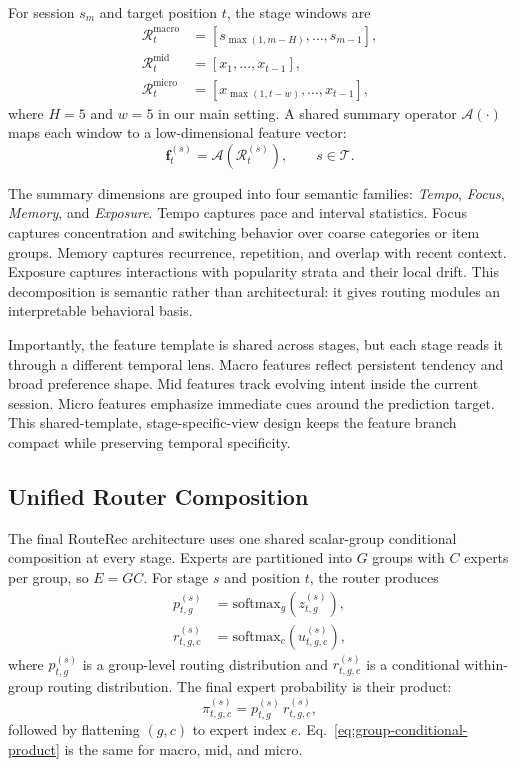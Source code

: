 \documentclass[sigconf,review,anonymous]{acmart}
\begin{document}
For session $s_m$ and target position $t$, the stage windows are
\begin{align}
\mathcal{R}^{\mathrm{macro}}_t &= [s_{\max(1,m-H)},\dots,s_{m-1}], \\
\mathcal{R}^{\mathrm{mid}}_t &= [x_1,\dots,x_{t-1}], \\
\mathcal{R}^{\mathrm{micro}}_t &= [x_{\max(1,t-w)},\dots,x_{t-1}],
\end{align}
where $H=5$ and $w=5$ in our main setting. A shared summary operator $\mathcal{A}(\cdot)$ maps each window to a low-dimensional feature vector:
\[
\mathbf{f}^{(s)}_t=\mathcal{A}(\mathcal{R}^{(s)}_t),\qquad s\in\mathcal{T}.
\]

The summary dimensions are grouped into four semantic families: \textit{Tempo}, \textit{Focus}, \textit{Memory}, and \textit{Exposure}. Tempo captures pace and interval statistics. Focus captures concentration and switching behavior over coarse categories or item groups. Memory captures recurrence, repetition, and overlap with recent context. Exposure captures interactions with popularity strata and their local drift. This decomposition is semantic rather than architectural: it gives routing modules an interpretable behavioral basis.

Importantly, the feature template is shared across stages, but each stage reads it through a different temporal lens. Macro features reflect persistent tendency and broad preference shape. Mid features track evolving intent inside the current session. Micro features emphasize immediate cues around the prediction target. This shared-template, stage-specific-view design keeps the feature branch compact while preserving temporal specificity.

\subsection{Unified Router Composition}

The final RouteRec architecture uses one shared scalar-group conditional composition at every stage. Experts are partitioned into $G$ groups with $C$ experts per group, so $E=GC$. For stage $s$ and position $t$, the router produces
\begin{align}
p^{(s)}_{t,g} &= \mathrm{softmax}_g\!\left(z^{(s)}_{t,g}\right), \\
r^{(s)}_{t,g,c} &= \mathrm{softmax}_c\!\left(u^{(s)}_{t,g,c}\right),
\end{align}
where $p^{(s)}_{t,g}$ is a group-level routing distribution and $r^{(s)}_{t,g,c}$ is a conditional within-group routing distribution. The final expert probability is their product:
\begin{equation}
\pi^{(s)}_{t,g,c}=p^{(s)}_{t,g}\,r^{(s)}_{t,g,c},
\label{eq:group-conditional-product}
\end{equation}
followed by flattening $(g,c)$ to expert index $e$. Eq.~\eqref{eq:group-conditional-product} is the same for macro, mid, and micro.
\end{document}
